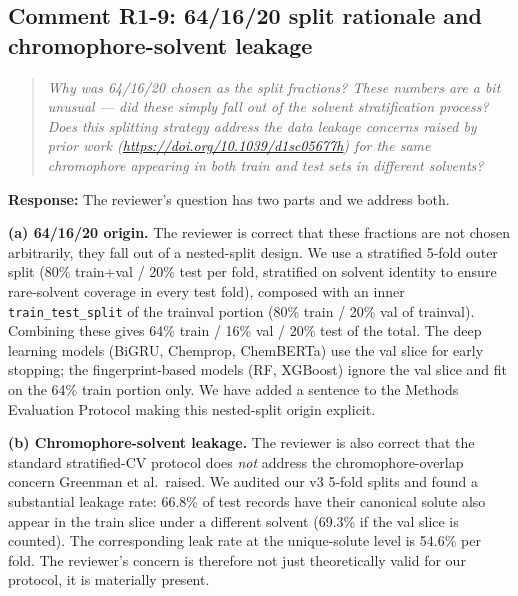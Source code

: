 \documentclass[11pt]{article}
\newenvironment{reviewer}{%
  \begin{quote}\itshape\color{black!70}}{%
  \end{quote}}
\newcommand{\response}[1]{\noindent\textbf{Response:} #1\par\medskip}
\begin{document}
\subsection*{Comment R1-9: 64/16/20 split rationale and chromophore-solvent leakage}
\begin{reviewer}
Why was 64/16/20 chosen as the split fractions? These numbers are a bit unusual --- did these simply fall out of the solvent stratification process? Does this splitting strategy address the data leakage concerns raised by prior work (\url{https://doi.org/10.1039/d1sc05677h}) for the same chromophore appearing in both train and test sets in different solvents?
\end{reviewer}

\response{The reviewer's question has two parts and we address both.

\textbf{(a) 64/16/20 origin.} The reviewer is correct that these fractions are not chosen arbitrarily, they fall out of a nested-split design. We use a stratified 5-fold outer split (80\% train+val / 20\% test per fold, stratified on solvent identity to ensure rare-solvent coverage in every test fold), composed with an inner \texttt{train\_test\_split} of the trainval portion (80\% train / 20\% val of trainval). Combining these gives 64\% train / 16\% val / 20\% test of the total. The deep learning models (BiGRU, Chemprop, ChemBERTa) use the val slice for early stopping; the fingerprint-based models (RF, XGBoost) ignore the val slice and fit on the 64\% train portion only. We have added a sentence to the Methods Evaluation Protocol making this nested-split origin explicit.

\textbf{(b) Chromophore-solvent leakage.} The reviewer is also correct that the standard stratified-CV protocol does \emph{not} address the chromophore-overlap concern Greenman et al.\ raised. We audited our v3 5-fold splits and found a substantial leakage rate: 66.8\% of test records have their canonical solute also appear in the train slice under a different solvent (69.3\% if the val slice is counted). The corresponding leak rate at the unique-solute level is 54.6\% per fold. The reviewer's concern is therefore not just theoretically valid for our protocol, it is materially present.

}
\end{document}
